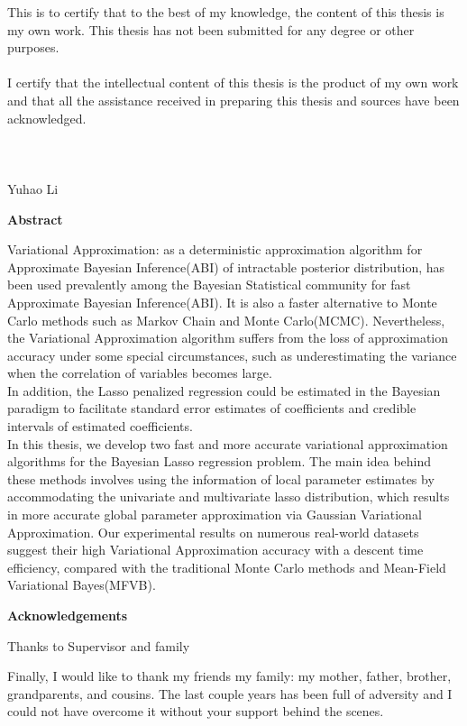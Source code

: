 \noindent This is to certify that to the best of my knowledge, the content of this thesis is my own work. This thesis has not been submitted for any degree or other purposes.\\
\\
\noindent I certify that the intellectual content of this thesis is the product of my own work and that all the assistance received in preparing this thesis and sources have been acknowledged.\\
\\
\\
\\
Yuhao Li

\pagebreak
\hspace{0pt}

\begin{center}
    \textbf{\large Abstract }\\
    \vspace{0.5cm}
\end{center}
Variational Approximation: as a deterministic approximation algorithm for Approximate Bayesian Inference(ABI) of intractable posterior distribution, has been used prevalently among the Bayesian Statistical community for fast Approximate Bayesian Inference(ABI). It is also a faster alternative to Monte Carlo methods such as Markov Chain and Monte Carlo(MCMC). Nevertheless, the Variational Approximation algorithm suffers from the loss of approximation accuracy under some special circumstances, such as underestimating the variance when the correlation of variables becomes large. \\
In addition, the Lasso penalized regression could be estimated in the Bayesian paradigm to facilitate standard error estimates of coefficients and credible intervals of estimated coefficients.\\
In this thesis, we develop two fast and more accurate variational approximation algorithms for the Bayesian Lasso regression problem. The main idea behind these methods involves using the information of local parameter estimates by accommodating the univariate and multivariate lasso distribution, which results in more accurate global parameter approximation via Gaussian Variational Approximation. Our experimental results on numerous real-world datasets suggest their high Variational Approximation accuracy with a descent time efficiency, compared with the traditional Monte Carlo methods and Mean-Field Variational Bayes(MFVB).


\newpage

\begin{center}
    \textbf{\large Acknowledgements}\\
    \vspace{0.5cm}
\end{center}
   Thanks to Supervisor and family 
   
   Finally, I would like to thank my friends   my family: my mother, father, brother, grandparents, and cousins. The last couple years has been full of adversity and I could not have overcome it without your support behind the scenes.
   
\vfill
\hspace{0pt}
\pagebreak
\newpage